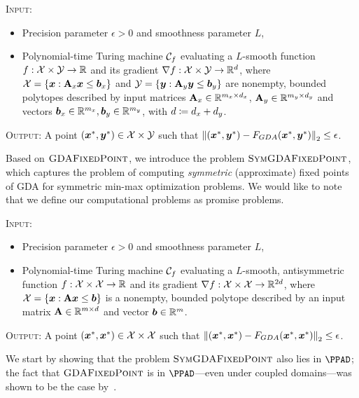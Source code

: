 \begin{nproblem}[\gdaFixed]
  \textsc{Input:} 
  \begin{itemize}
  \item Precision parameter $\epsilon > 0$ and smoothness parameter $L$,
  \item Polynomial-time Turing
  machine $\mathcal{C}_f$ evaluating a $L$-smooth function $f : \mathcal{X} \times \mathcal{Y} \to \mathbb{R}$ and its gradient
  $\nabla f: \mathcal{X}\times \mathcal{Y} \to \mathbb{R}^{d}$, where
   $\mathcal{X} = \{{\bm{x}}:\mathbf{A}_x {\bm{x}} \leq \bm{b}_x\}$ and $\mathcal{Y} = \{{\bm{y}}:\mathbf{A}_y {\bm{y}} \leq \bm{b}_y\}$ are nonempty, bounded polytopes described by input matrices
  $\mathbf{A}_x \in \mathbb{R}^{m_x \times d_x}$, $\mathbf{A}_y \in \mathbb{R}^{m_y \times d_y}$ and vectors $\bm{b}_x \in \mathbb{R}^{m_x}, \bm{b}_y \in \mathbb{R}^{m_y}$, with $d \coloneqq d_x + d_y$.
\end{itemize}
  \noindent \textsc{Output:} A point
  $({\bm{x}}^*,{\bm{y}}^*)\in \mathcal{X}\times\mathcal{Y}$ such that
  $\left\| ({\bm{x}}^*, {\bm{y}}^*) - F_{GDA}({\bm{x}}^*,{\bm{y}}^*) \right\|_2 \leq \epsilon$.
\end{nproblem}

Based on $\textsc{GDAFixedPoint}$, we introduce the problem $\textsc{SymGDAFixedPoint}$, which captures the problem of computing \emph{symmetric} (approximate) fixed points of GDA for symmetric min-max optimization problems. We would like to note that we define our computational problems as promise problems.
  
\begin{nproblem}[\symgdaFixed]
 \textsc{Input:}    \begin{itemize}
  \item Precision parameter $\epsilon > 0$ and smoothness parameter $L$, 
  \item Polynomial-time Turing
  machine $\mathcal{C}_f$ evaluating a $L$-smooth, antisymmetric function $f : \mathcal{X} \times \mathcal{X} \to \mathbb{R}$ and its gradient
  $\nabla f: \mathcal{X}\times \mathcal{X} \to \mathbb{R}^{2d}$, where
  $\mathcal{X} = \{{\bm{x}}:\mathbf{A} {\bm{x}} \leq \bm{b}\}$ is a nonempty, bounded polytope described by an input matrix
  $\mathbf{A} \in \mathbb{R}^{m \times d}$ and vector $\bm{b} \in \mathbb{R}^{m}$.
\end{itemize}

  \noindent \textsc{Output:} A point
  $({\bm{x}}^*,{\bm{x}}^*)\in \mathcal{X}\times\mathcal{X}$ such that
  $\left\| ({\bm{x}}^*, {\bm{x}}^*) - F_{GDA}({\bm{x}}^*,{\bm{x}}^*) \right\|_2 \leq \epsilon$.
\end{nproblem}

We start by showing that the problem $\textsc{SymGDAFixedPoint}$ also lies in $\PPAD$; the fact that $\textsc{GDAFixedPoint}$ is in $\PPAD$---even under coupled domains---was shown to be the case by~\citet{DSZ21}.

